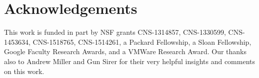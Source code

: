 \section*{Acknowledgements}

This work is funded in part by NSF grants CNS-1314857, CNS-1330599, CNS-1453634, CNS-1518765, CNS-1514261, a Packard Fellowship, a Sloan Fellowship, Google Faculty Research Awards, and a VMWare Research Award. Our thanks also to Andrew Miller and Gun Sirer for their very helpful insights and comments on this work.